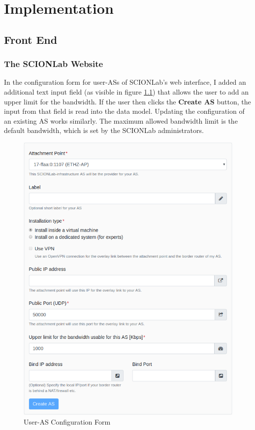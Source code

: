\chapter{Implementation} \label{Implementation}

\section{Front End}

\subsection{The SCIONLab Website}

\begin{minipage}{0.45\textwidth}
In the configuration form for user-\acsp{AS} of \acs{SCIONLab}'s web interface, I added an additional text input field (as visible in figure \ref{User-AS Configuration Form}) that allows the user to add an upper limit for the bandwidth. If the user then clicks the \textbf{Create \acs{AS}} button, the input from that field is read into the data model. Updating the configuration of an existing \acs{AS} works similarly. The maximum allowed bandwidth limit is the default bandwidth, which is set by the \acs{SCIONLab} administrators.
\end{minipage} \hfill
\begin{minipage}{0.5\textwidth}
\begin{figure}[H]
	\includegraphics[width=\textwidth]{img/user_as_form.png}
	\centering
	\caption{User-AS Configuration Form}
	\label{User-AS Configuration Form}
\end{figure}
\end{minipage}

